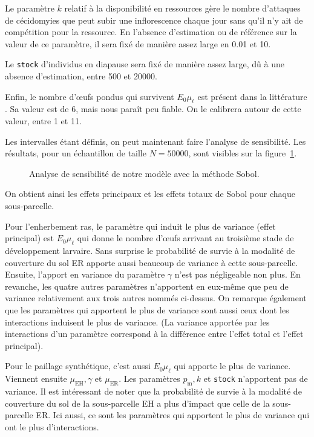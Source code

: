 Le paramètre $k$ relatif à la disponibilité en ressources gère le nombre d'attaques de cécidomyies que peut subir une inflorescence chaque jour sans qu'il n'y ait de compétition pour la ressource.
En l'absence d'estimation ou de référence sur la valeur de ce paramètre, il sera fixé de manière assez large en 0.01 et 10.

Le \texttt{stock} d'individus en diapause sera fixé de manière assez large, dû à une absence d'estimation, entre 500 et 20000.

Enfin, le nombre d'œufs pondus qui survivent $E_0\mu_\ell$ est présent dans la littérature \citep{paul}.
Sa valeur est de 6, mais nous paraît peu fiable.
On le calibrera autour de cette valeur, entre 1 et 11.

Les intervalles étant définis, on peut maintenant faire l'analyse de sensibilité. Les résultats, pour un échantillon de taille $N = 50000$, sont visibles sur la figure~\ref{fig:sa}.

\begin{figure}
 \centering
 \caption{Analyse de sensibilité de notre modèle avec la méthode Sobol.}
 \label{fig:sa}
\end{figure}

On obtient ainsi les effets principaux et les effets totaux de Sobol pour chaque sous-parcelle.

Pour l'enherbement ras, le paramètre qui induit le plus de variance (effet principal) est $E_0\mu_\ell$ qui donne le nombre d'œufs arrivant au troisième stade de développement larvaire.
Sans surprise le probabilité de survie à la modalité de couverture du sol ER apporte aussi beaucoup de variance à cette sous-parcelle.
Ensuite, l'apport en variance du paramètre $\gamma$ n'est pas négligeable non plus.
En revanche, les quatre autres paramètres n'apportent en eux-même que peu de variance relativement aux trois autres nommés ci-dessus.
On remarque également que les paramètres qui apportent le plus de variance sont aussi ceux dont les interactions induisent le plus de variance.
(La variance apportée par les interactions d'un paramètre correspond à la différence entre l'effet total et l'effet principal).

Pour le paillage synthétique, c'est aussi $E_0\mu_\ell$ qui apporte le plus de variance.
Viennent ensuite $\mu_{\text{EH}}, \gamma$ et $\mu_{\text{ER}}$.
Les paramètres $p_{\text{m}}, k$ et \texttt{stock} n'apportent pas de variance.
Il est intéressant de noter que la probabilité de survie à la modalité de couverture du sol de la sous-parcelle EH a plus d'impact que celle de la sous-parcelle ER.
Ici aussi, ce sont les paramètres qui apportent le plus de variance qui ont le plus d'interactions.

